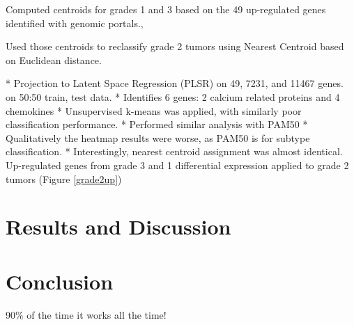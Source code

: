 \documentclass[a4paper,10pt]{article}
\begin{document}
Computed centroids for grades 1 and 3 based on the 49 up-regulated genes identified with genomic portals.\cite{Treeview},\cite{CLEAN}

Used those centroids to reclassify grade 2 tumors using Nearest Centroid based on Euclidean distance.

* Projection to Latent Space Regression (PLSR) on 49, 7231, and 11467 genes.
 on 50:50 train, test data. 
* Identifies 6 genes: 2 calcium related proteins and 4 chemokines
* Unsupervised k-means was
  applied, with similarly poor classification     performance.
* Performed similar analysis with PAM50 
* Qualitatively the heatmap results were worse, as PAM50 is for subtype classification.
* Interestingly, nearest centroid assignment was almost identical.
Up-regulated genes from grade 3 and 1 differential expression applied to grade 2 tumors (Figure \ref{grade2up})

\section{Results and Discussion}
\section{Conclusion}
90\% of the time it works all the time!

 \markright{ }
\end{document}
